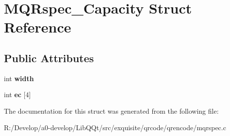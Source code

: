 \hypertarget{struct_m_q_rspec___capacity}{}\section{M\+Q\+Rspec\+\_\+\+Capacity Struct Reference}
\label{struct_m_q_rspec___capacity}
\subsection*{Public Attributes}
\begin{DoxyCompactItemize}
\item 
\mbox{\label{struct_m_q_rspec___capacity_aa95d3b704031a62c424210452c4145ff}} 
int {\bfseries width}
\item 
\mbox{\label{struct_m_q_rspec___capacity_a0f2eb0571ef41dae7c38e5022faaa0be}} 
int {\bfseries ec} \mbox{[}4\mbox{]}
\end{DoxyCompactItemize}


The documentation for this struct was generated from the following file\+:\begin{DoxyCompactItemize}
\item 
R\+:/\+Develop/a0-\/develop/\+Lib\+Q\+Qt/src/exquisite/qrcode/qrencode/mqrspec.\+c\end{DoxyCompactItemize}
